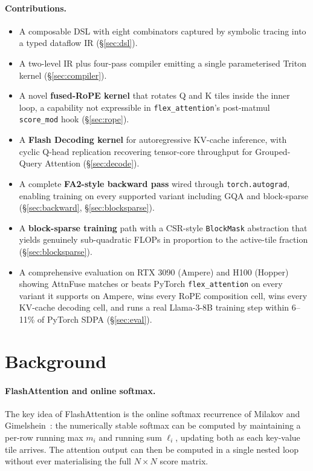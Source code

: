 \documentclass[10pt,twocolumn]{article}
\begin{document}
\paragraph{Contributions.}
\begin{itemize}[leftmargin=1.2em,itemsep=1pt]
  \item A composable DSL with eight combinators captured by symbolic
        tracing into a typed dataflow IR (\S\ref{sec:dsl}).
  \item A two-level IR plus four-pass compiler emitting a single
        parameterised Triton kernel (\S\ref{sec:compiler}).
  \item A novel \textbf{fused-RoPE kernel} that rotates Q and K
        tiles inside the inner loop, a capability not expressible
        in \texttt{flex\_attention}'s post-matmul \texttt{score\_mod} hook
        (\S\ref{sec:rope}).
  \item A \textbf{Flash Decoding kernel} for autoregressive KV-cache
        inference, with cyclic Q-head replication recovering tensor-core
        throughput for Grouped-Query Attention (\S\ref{sec:decode}).
  \item A complete \textbf{FA2-style backward pass} wired through
        \texttt{torch.autograd}, enabling training on every supported
        variant including GQA and block-sparse (\S\ref{sec:backward},
        \S\ref{sec:blocksparse}).
  \item A \textbf{block-sparse training} path with a CSR-style
        \texttt{BlockMask} abstraction that yields genuinely
        sub-quadratic FLOPs in proportion to the active-tile fraction
        (\S\ref{sec:blocksparse}).
  \item A comprehensive evaluation on RTX 3090 (Ampere) and H100
        (Hopper) showing AttnFuse matches or beats PyTorch
        \texttt{flex\_attention} on every variant it supports on
        Ampere, wins every RoPE composition cell, wins every KV-cache
        decoding cell, and runs a real Llama-3-8B training step within
        6--11\% of PyTorch SDPA (\S\ref{sec:eval}).
\end{itemize}

\section{Background}
\label{sec:background}

\paragraph{FlashAttention and online softmax.}
The key idea of FlashAttention is the online softmax recurrence of
Milakov and Gimelshein~\cite{milakov2018online}: the numerically stable
softmax can be computed by maintaining a per-row running max $m_i$ and
running sum $\ell_i$, updating both as each key-value tile arrives. The
attention output can then be computed in a single nested loop without
ever materialising the full $N \times N$ score matrix.
\end{document}
